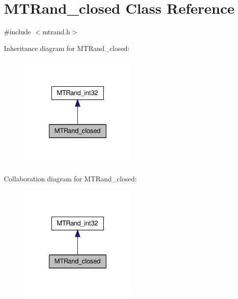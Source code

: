\hypertarget{a00012}{\section{M\-T\-Rand\-\_\-closed Class Reference}
\label{a00012}
}


{\ttfamily \#include $<$mtrand.\-h$>$}



Inheritance diagram for M\-T\-Rand\-\_\-closed\-:\nopagebreak
\begin{figure}[H]
\begin{center}
\leavevmode
\includegraphics[width=166pt]{a00151}
\end{center}
\end{figure}


Collaboration diagram for M\-T\-Rand\-\_\-closed\-:\nopagebreak
\begin{figure}[H]
\begin{center}
\leavevmode
\includegraphics[width=166pt]{a00152}
\end{center}
\end{figure}
